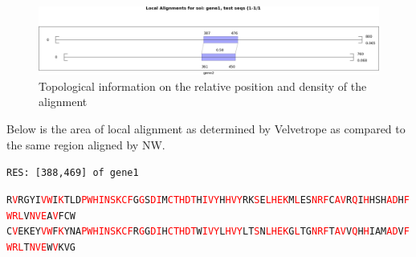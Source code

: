 \documentclass[phd,tocprelim]{cornell}
\begin{document}
\begin{figure}[hpt]
	\centering
		\includegraphics[width=1.0\textwidth]{figures/velvetrope/hmm1_2.png}
        \caption[Topological information of NW HMM test]{Topological information on the relative position and density of the alignment}
	\label{fig:06}
\end{figure}

Below is the area of local alignment as determined by Velvetrope as compared to the same region aligned by NW.

\begin{flushleft}
    \singlespacing
\footnotesize 
\texttt{RES: [388,469] of gene1}           

\texttt{R\textcolor{red}{V}RGYI\textcolor{red}{V}\textcolor{red}{W}I\textcolor{red}{K}TLD\textcolor{red}{P}\textcolor{red}{W}\textcolor{red}{H}\textcolor{red}{I}\textcolor{red}{N}\textcolor{red}{S}\textcolor{red}{K}\textcolor{red}{C}\textcolor{red}{F}G\textcolor{red}{G}S\textcolor{red}{D}\textcolor{red}{I}M\textcolor{red}{C}\textcolor{red}{T}\textcolor{red}{H}\textcolor{red}{D}\textcolor{red}{T}H\textcolor{red}{I}\textcolor{red}{V}\textcolor{red}{Y}H\textcolor{red}{H}\textcolor{red}{V}\textcolor{red}{Y}RK\textcolor{red}{S}E\textcolor{red}{L}\textcolor{red}{H}\textcolor{red}{E}\textcolor{red}{K}M\textcolor{red}{L}ES\textcolor{red}{N}\textcolor{red}{R}\textcolor{red}{F}C\textcolor{red}{A}\textcolor{red}{V}R\textcolor{red}{Q}I\textcolor{red}{H}HSH\textcolor{red}{A}\textcolor{red}{D}H\textcolor{red}{F}\textcolor{red}{W}\textcolor{red}{R}\textcolor{red}{L}V\textcolor{red}{N}\textcolor{red}{V}\textcolor{red}{E}A\textcolor{red}{V}FCW} \\
\texttt{C\textcolor{red}{V}EKEY\textcolor{red}{V}\textcolor{red}{W}F\textcolor{red}{K}YNA\textcolor{red}{P}\textcolor{red}{W}\textcolor{red}{H}\textcolor{red}{I}\textcolor{red}{N}\textcolor{red}{S}\textcolor{red}{K}\textcolor{red}{C}\textcolor{red}{F}R\textcolor{red}{G}G\textcolor{red}{D}\textcolor{red}{I}H\textcolor{red}{C}\textcolor{red}{T}\textcolor{red}{H}\textcolor{red}{D}\textcolor{red}{T}W\textcolor{red}{I}\textcolor{red}{V}\textcolor{red}{Y}L\textcolor{red}{H}\textcolor{red}{V}\textcolor{red}{Y}LT\textcolor{red}{S}N\textcolor{red}{L}\textcolor{red}{H}\textcolor{red}{E}\textcolor{red}{K}G\textcolor{red}{L}TG\textcolor{red}{N}\textcolor{red}{R}\textcolor{red}{F}T\textcolor{red}{A}\textcolor{red}{V}V\textcolor{red}{Q}H\textcolor{red}{H}IAM\textcolor{red}{A}\textcolor{red}{D}V\textcolor{red}{F}\textcolor{red}{W}\textcolor{red}{R}\textcolor{red}{L}T\textcolor{red}{N}\textcolor{red}{V}\textcolor{red}{E}W\textcolor{red}{V}KVG}


\end{flushleft}
\end{document}
